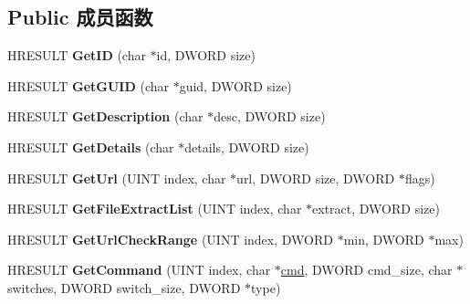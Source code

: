 \subsection*{Public 成员函数}
\begin{DoxyCompactItemize}
\item 
\mbox{\label{interface_i_cif_component_abd737630b83455ab068020d490805d95}} 
H\+R\+E\+S\+U\+LT {\bfseries Get\+ID} (char $\ast$id, D\+W\+O\+RD size)
\item 
\mbox{\label{interface_i_cif_component_af78840deb71a4368aea4b377435a5c42}} 
H\+R\+E\+S\+U\+LT {\bfseries Get\+G\+U\+ID} (char $\ast$guid, D\+W\+O\+RD size)
\item 
\mbox{\label{interface_i_cif_component_af9b622f150cbf3045f1f0dea4103751a}} 
H\+R\+E\+S\+U\+LT {\bfseries Get\+Description} (char $\ast$desc, D\+W\+O\+RD size)
\item 
\mbox{\label{interface_i_cif_component_ad52de1f3b6555ddf6a7cc51f506dd31e}} 
H\+R\+E\+S\+U\+LT {\bfseries Get\+Details} (char $\ast$details, D\+W\+O\+RD size)
\item 
\mbox{\label{interface_i_cif_component_a98e926610a508aab7bf0af4c59a0144d}} 
H\+R\+E\+S\+U\+LT {\bfseries Get\+Url} (U\+I\+NT index, char $\ast$url, D\+W\+O\+RD size, D\+W\+O\+RD $\ast$flags)
\item 
\mbox{\label{interface_i_cif_component_a6e79616de4acad998d342dd74eb03f14}} 
H\+R\+E\+S\+U\+LT {\bfseries Get\+File\+Extract\+List} (U\+I\+NT index, char $\ast$extract, D\+W\+O\+RD size)
\item 
\mbox{\label{interface_i_cif_component_a7ab77fce62f4776ffd6362f0b9b5e8eb}} 
H\+R\+E\+S\+U\+LT {\bfseries Get\+Url\+Check\+Range} (U\+I\+NT index, D\+W\+O\+RD $\ast$min, D\+W\+O\+RD $\ast$max)
\item 
\mbox{\label{interface_i_cif_component_a90fede0235c35840365783b024e54ed0}} 
H\+R\+E\+S\+U\+LT {\bfseries Get\+Command} (U\+I\+NT index, char $\ast$\hyperlink{structcmd}{cmd}, D\+W\+O\+RD cmd\+\_\+size, char $\ast$switches, D\+W\+O\+RD switch\+\_\+size, D\+W\+O\+RD $\ast$type)

\end{DoxyCompactItemize}
